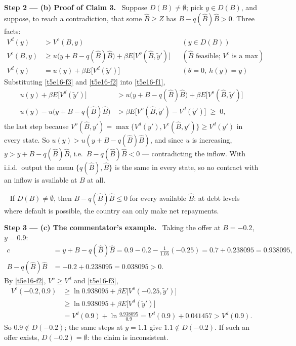 \documentclass[11pt,a4paper]{article}
\newcommand{\step}[2]{\par\medskip\noindent\textbf{Step #1 --- #2.}~}
\newcommand{\answer}[1]{\par\smallskip\noindent\fbox{\textbf{Answer #1.}}~}
\begin{document}
\step{2}{(b) Proof of Claim 3} Suppose $D(B)\neq\emptyset$; pick $y\in D(B)$, and suppose, to reach a contradiction, that some $\hat B\ge Z$ has $B-q(\hat B)\hat B>0$. Three facts:
\begin{align}
  V^d(y) &> V^c(B,y) && (y\in D(B)) \label{t5e16-f1}\\
  V^c(B,y) &\ge u\big(y+B-q(\hat B)\hat B\big)+\beta E\big[V^o(\hat B,\tilde y')\big] && (\hat B \text{ feasible; } V^c \text{ is a max}) \label{t5e16-f2}\\
  V^d(y) &= u(y)+\beta E\big[V^d(\tilde y')\big] && (\theta=0,\ h(y)=y) \label{t5e16-f3}
\end{align}
Substituting \eqref{t5e16-f3} and \eqref{t5e16-f2} into \eqref{t5e16-f1},
\begin{align}
  u(y)+\beta E\big[V^d(\tilde y')\big] &> u\big(y+B-q(\hat B)\hat B\big)+\beta E\big[V^o(\hat B,\tilde y')\big] \nonumber\\
  u(y)-u\big(y+B-q(\hat B)\hat B\big) &> \beta E\big[V^o(\hat B,\tilde y')-V^d(\tilde y')\big] \;\ge\; 0, \label{t5e16-key}
\end{align}
the last step because $V^o(\hat B,y')=\max\{V^d(y'),V^c(\hat B,y')\}\ge V^d(y')$ in every state. So $u(y)>u(y+B-q(\hat B)\hat B)$, and since $u$ is increasing,
$y>y+B-q(\hat B)\hat B$, i.e.\ $B-q(\hat B)\hat B<0$ --- contradicting the inflow. With i.i.d.\ output the menu $\{q(\hat B),\hat B\}$ is the same in every state, so
no contract with an inflow is available at $B$ at all.

\answer{(b)} If $D(B)\neq\emptyset$, then $B-q(\hat B)\hat B\le0$ for every available $\hat B$: at debt levels where default is possible, the country can only make net repayments.

\step{3}{(c) The commentator's example} Taking the offer at $B=-0.2$, $y=0.9$:
\begin{align}
  c &= y+B-q(\hat B)\hat B = 0.9-0.2-\tfrac{1}{1.05}(-0.25) = 0.7+0.238095 = 0.938095, \nonumber\\
  B-q(\hat B)\hat B &= -0.2+0.238095 = 0.038095 > 0. \nonumber
\end{align}
By \eqref{t5e16-f2}, $V^o\ge V^d$ and \eqref{t5e16-f3},
\begin{align}
  V^c(-0.2,0.9) &\ge \ln0.938095+\beta E\big[V^o(-0.25,\tilde y')\big] \nonumber\\
                &\ge \ln0.938095+\beta E\big[V^d(\tilde y')\big] \nonumber\\
                &= V^d(0.9)+\ln\frac{0.938095}{0.9} = V^d(0.9)+0.041457 > V^d(0.9). \nonumber
\end{align}
So $0.9\notin D(-0.2)$; the same steps at $y=1.1$ give $1.1\notin D(-0.2)$. If such an offer exists, $D(-0.2)=\emptyset$: the claim is inconsistent.
\end{document}
